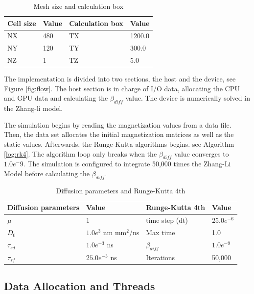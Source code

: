 \begin{table}[h]
\centering
\begin{tabular}{| l | l | l | l |}
\hline
Cell size & Value & Calculation box & Value \\
\hline
 NX & 480 &  TX  & 1200.0   \\
\hline
 NY & 120 &  TY  & 300.0  \\
\hline
 NZ &	1 &  TZ  & 5.0   \\
\hline
\end{tabular}
\caption{Mesh size and calculation box}
\label{tab:mesh}
\end{table}

The implementation is divided into two sections, the host and the device, see Figure \ref{fig:flow}. The host section is in charge of I/O data, allocating the CPU and GPU data and calculating the $\beta_{diff}$ value. The device is numerically solved in the Zhang-li model.

The simulation begins by reading the magnetization values from a data file. Then, the data set allocates the initial magnetization matrices as well as the static values. Afterwards, the Runge-Kutta algorithms begins. see Algorithm \ref{log:rk4}. The algorithm loop only breaks when the $\beta_{diff}$ value converges to $1.0e^-9$. The simulation is configured to integrate 50,000 times the Zhang-Li Model before calculating the $\beta_{diff}$.

\begin{table}[h]
\centering
\begin{tabular}{| l | l | l | l |}
\hline
Diffusion parameters& Value & Runge-Kutta 4th & Value \\
\hline 
$\mu$ & 1 &  time step (dt) &   $25.0e^{-6}$   \\
\hline
$D_{0}$ & $1.0e^{3}$ nm mm$^2$/ns  & Max time  & 1.0  \\
\hline
$\tau_{sd}$ & $1.0e^{-3}$ ns  & $\beta_{diff}$ & $1.0e^{-9}$ \\
\hline
$\tau_{sf}$ & $25.0e^{-3}$ ns  & Iterations & 50,000 \\
\hline
\end{tabular}
\caption{Diffusion parameters and Runge-Kutta 4th}
\label{tab:drk}
\end{table}

\subsection{Data Allocation and Threads}

